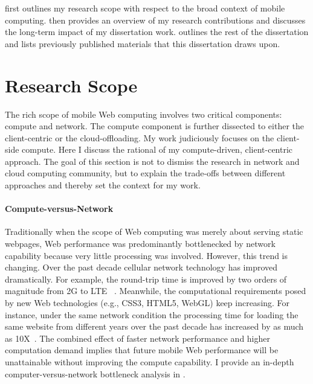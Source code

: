  first outlines my research scope with respect to the broad context of mobile computing.  then provides an overview of my research contributions and  discusses the long-term impact of my dissertation work.  outlines the rest of the dissertation and  lists previously published materials that this dissertation draws upon.

\section{Research Scope}
\label{sec:intro:scope}

The rich scope of mobile Web computing involves two critical components: compute and network. The compute component is further dissected to either the client-centric or the cloud-offloading. My work judiciously focuses on the client-side compute. Here I discuss the rational of my compute-driven, client-centric approach. The goal of this section is not to dismiss the research in network and cloud computing community, but to explain the trade-offs between different approaches and thereby set the context for my work.

\paragraph{Compute-versus-Network} Traditionally when the scope of Web computing was merely about serving static webpages, Web performance was predominantly bottlenecked by network capability because very little processing was involved. However, this trend is changing. Over the past decade cellular network technology has improved dramatically. For example, the round-trip time is improved by two orders of magnitude from 2G to LTE ~\cite{4gtest}. Meanwhile, the computational requirements posed by new Web technologies (e.g., CSS3, HTML5, WebGL) keep increasing. For instance, under the same network condition the processing time for loading the same website from different years over the past decade has increased by as much as 10X~\cite{big-little}. The combined effect of faster network performance and higher computation demand implies that future mobile Web performance will be unattainable without improving the compute capability. I provide an in-depth computer-versus-network bottleneck analysis in .

